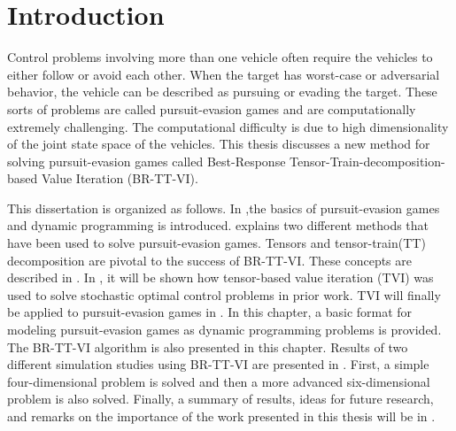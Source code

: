\chapter{Introduction}\label{chp:intro} 
Control problems involving more than one vehicle often require the vehicles to either follow or avoid each other. When the target has worst-case or adversarial behavior, the vehicle can be described as pursuing or evading the target. These sorts of problems are called pursuit-evasion games and are computationally extremely challenging. The computational difficulty is due to high dimensionality of the joint state space of the vehicles. This thesis discusses a new method for solving pursuit-evasion games called Best-Response Tensor-Train-decomposition-based Value Iteration (BR-TT-VI). 

This dissertation is organized as follows. In ,the basics of pursuit-evasion games and dynamic programming is introduced.  explains two different methods that have been used to solve pursuit-evasion games. Tensors and tensor-train(TT) decomposition are pivotal to the success of BR-TT-VI. These concepts are described in . In , it will be shown how tensor-based value iteration (TVI) was used to solve stochastic optimal control problems in prior work. TVI will finally be applied to pursuit-evasion games in . In this chapter, a basic format for modeling pursuit-evasion games as dynamic programming problems is provided. The BR-TT-VI algorithm is also presented in this chapter. Results of two different simulation studies using BR-TT-VI are presented in . First, a simple four-dimensional problem is solved and then a more advanced six-dimensional problem is also solved. Finally, a summary of results, ideas for future research, and remarks on the importance of the work presented in this thesis will be in .
    
